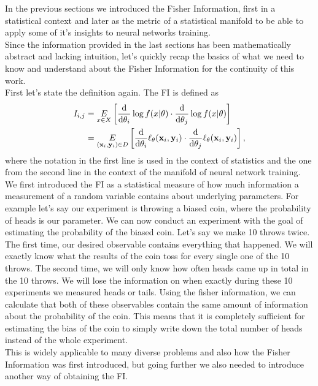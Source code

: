 In the previous sections we introduced the Fisher Information, first in a statistical context and later as the metric of a statistical manifold to be able to apply some of it's insights to neural networks training.\\
Since the information provided in the last sections has been mathematically abstract and lacking intuition, let's quickly recap the basics of what we need to know and understand about the Fisher Information for the continuity of this work.\\
First let's state the definition again. The FI is defined as 
\begin{equation}
	\begin{split}
		I_{i,j} &= \underset{x \in X}{E} \left[\frac{\mathrm{d}}{\mathrm{d}\theta_i}\log f(x|\theta)\cdot \frac{\mathrm{d}}{\mathrm{d}\theta_j}\log f(x|\theta)\right]\\
		&= \underset{(\mathbf{x}_i,\mathbf{y}_i)\in D}{E} \left[\frac{\mathrm{d}}{\mathrm{d}\theta_i}\ell_\theta(\mathbf{x}_i,\mathbf{y}_i)\cdot \frac{\mathrm{d}}{\mathrm{d}\theta_j}\ell_\theta(\mathbf{x}_i,\mathbf{y}_i)\right],
	\end{split}
\end{equation}
where the notation in the first line is used in the context of statistics and the one from the second line in the context of the manifold of neural network training.\\
We first introduced the FI as a statistical measure of how much information a measurement of a random variable contains about underlying parameters. For example let's say our experiment is throwing a biased coin, where the probability of heads is our parameter. We can now conduct an experiment with the goal of estimating the probability of the biased coin. Let's say we make 10 throws twice. The first time, our desired observable contains everything that happened. We will exactly know what the results of the coin toss for every single one of the 10 throws. The second time, we will only know how often heads came up in total in the 10 throws. We will lose the information on when exactly during these 10 experiments we measured heads or tails. Using the fisher information, we can calculate that both of these observables contain the same amount of information about the probability of the coin. This means that it is completely sufficient for estimating the bias of the coin to simply write down the total number of heads instead of the whole experiment.\\
This is widely applicable to many diverse problems and also how the Fisher Information was first introduced, but going further we also needed to introduce another way of obtaining the FI.\\
